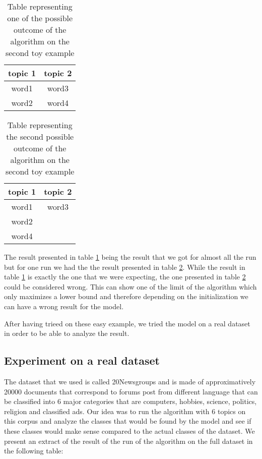 \begin{table}[ht]
	\centering
\begin{tabular}{c|c}
topic 1& topic 2\\
\hline
word1 & word3\\
word2 & word4
\end{tabular}
\caption{Table representing one of the possible outcome of the algorithm on the second toy example}
\label{tab2}
\end{table}

\begin{table}[ht]
	\centering
\begin{tabular}{c|c}
topic 1& topic 2\\
\hline
word1 & word3\\
word2 & \\
word4 & \\
\end{tabular}
\caption{Table representing the second possible outcome of the algorithm on the second toy example}
\label{tab3}
\end{table}
The result presented in table \ref{tab2} being the result that we got for almost all the run but for one run we had the the result presented in table \ref{tab3}. While the result in table \ref{tab2} is exactly the one that we were expecting, the one presented in table \ref{tab3} could be considered wrong. This can show one of the limit of the algorithm which only maximizes a lower bound and therefore depending on the initialization we can have a wrong result for the model.

After having trieed on these easy example, we tried the model on a real dataset in order to be able to analyze the result.

\subsection{Experiment on a real dataset}

The dataset that we used is called 20Newsgroups and is made of approximatively 20000 documents that correspond to forums post from different language that can be classified into 6 major categories that are computers, hobbies, science, politics, religion and classified ads. Our idea was to run the algorithm with 6 topics on this corpus and analyze the classes that would be found by the model and see if these classes would make sense compared to the actual classes of the dataset. We present an extract of the result of the run of the algorithm on the full dataset in the following table:

